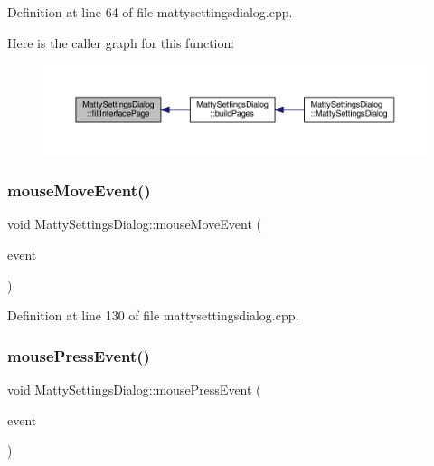 Definition at line 64 of file mattysettingsdialog.\+cpp.

Here is the caller graph for this function\+:
\nopagebreak
\begin{figure}[H]
\begin{center}
\leavevmode
\includegraphics[width=350pt]{classMattySettingsDialog_a4c8eaeb364e8fa94fe89fdbe2eb822b5_icgraph}
\end{center}
\end{figure}
\hypertarget{classMattySettingsDialog_a87e407b4afdfc3b255c4b5de1699349d}{}\label{classMattySettingsDialog_a87e407b4afdfc3b255c4b5de1699349d} 
\subsubsection{\texorpdfstring{mouse\+Move\+Event()}{mouseMoveEvent()}}
{\footnotesize\ttfamily void Matty\+Settings\+Dialog\+::mouse\+Move\+Event (\begin{DoxyParamCaption}\item[{Q\+Mouse\+Event $\ast$}]{event }\end{DoxyParamCaption})\hspace{0.3cm}{\ttfamily [private]}}



Definition at line 130 of file mattysettingsdialog.\+cpp.

\hypertarget{classMattySettingsDialog_aa3af114eb9192cf2ce488194bb30b761}{}\label{classMattySettingsDialog_aa3af114eb9192cf2ce488194bb30b761} 
\subsubsection{\texorpdfstring{mouse\+Press\+Event()}{mousePressEvent()}}
{\footnotesize\ttfamily void Matty\+Settings\+Dialog\+::mouse\+Press\+Event (\begin{DoxyParamCaption}\item[{Q\+Mouse\+Event $\ast$}]{event }\end{DoxyParamCaption})\hspace{0.3cm}{\ttfamily [private]}}



